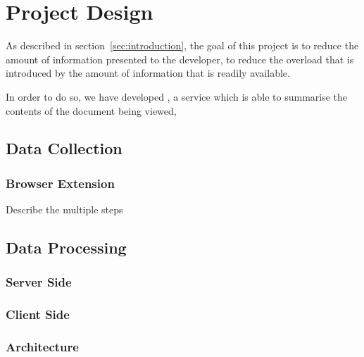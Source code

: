 \section{Project Design}\label{sec:projectDesign}
As described in section~\ref{sec:introduction}, the goal of this project is to reduce the amount of information presented to the developer, to reduce the overload that is introduced by the amount of information that is readily available.

In order to do so, we have developed \projectName, a service which is able to summarise the contents of the document being viewed, 
\subsection{\projectName}


\subsection{Data Collection}
\subsubsection{Browser Extension}
Describe the multiple steps

\subsection{Data Processing}
\subsubsection{Server Side}
\subsubsection{Client Side}


\subsubsection{Architecture}